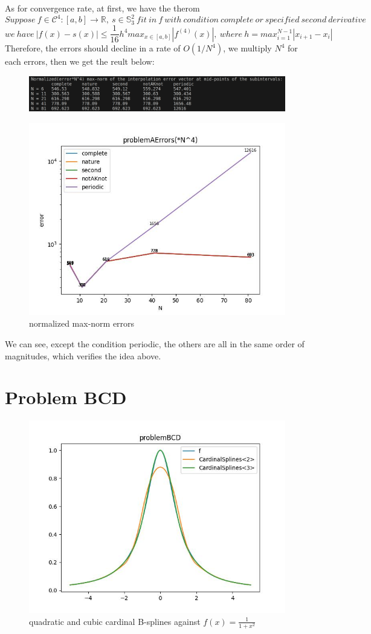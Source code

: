 \documentclass{article}
\begin{document}
As for convergence rate, at first, we have the therom
$$Suppose\ f \in \mathcal{C}^4:[a,b]\rightarrow \mathbb{R},\ s\in\mathbb{S}_{3}^{2} \ fit\ in\ f\ with\ condition\ complete\ or\ specified\ second\ derivative$$
$$we\ have\ |f(x)-s(x)|\leq\frac{1}{16}h^4max_{x\in[a,b]}|f^{(4)}(x)|,\ where\ h=max_{i=1}^{N-1}|x_{i+1}-x_i|$$
Therefore, the errors should decline in a rate of $O(1/N^4)$, we multiply $N^4$ for each errors, then we get the reult below:
\begin{figure}[h]
    \centering
    \includegraphics[width=0.8\linewidth]{problemAnorerrors.png}
\end{figure}
\begin{figure}[h]
    \centering
    \includegraphics[width=0.7\linewidth]{problemAErrors(*N^4).jpg}
    \caption{normalized max-norm errors}
\end{figure}
\newpage
We can see, except the condition periodic, the others are all in the same order of magnitudes, which verifies the idea above.
\section{Problem BCD}
\begin{figure}[h]
    \centering
    \includegraphics[width = 0.65\linewidth]{problemBCD.jpg}
    \caption{quadratic and cubic cardinal B-splines against $f(x)=\frac{1}{1+x^2}$}
\end{figure}
\newpage
\end{document}
